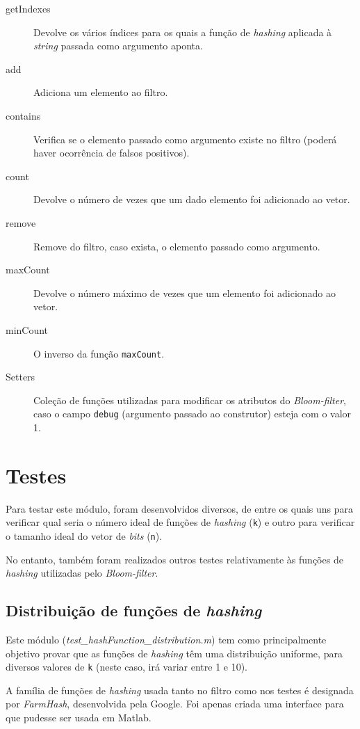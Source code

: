 \documentclass[a4paper,11pt,openright,oneside]{report}
\begin{document}
\begin{description}
\item[getIndexes]
Devolve os vários índices para os quais a função de \textit{hashing} aplicada à \textit{string} passada como argumento aponta.
\item[add]
Adiciona um elemento ao filtro.
\item[contains]
Verifica se o elemento passado como argumento existe no filtro (poderá haver ocorrência de falsos positivos).
\item[count]
Devolve o número de vezes que um dado elemento foi adicionado ao vetor.
\item[remove]
Remove do filtro, caso exista, o elemento passado como argumento.
\item[maxCount]
Devolve o número máximo de vezes que um elemento foi adicionado ao vetor.
\item[minCount]
O inverso da função \texttt{maxCount}.
\item[Setters]
Coleção de funções utilizadas para modificar os atributos do \textit{Bloom-filter}, caso o campo \texttt{debug} (argumento passado ao construtor) esteja com o valor 1.
\end{description}

\section{Testes}
\label{sec.bloomtests}

Para testar este módulo, foram desenvolvidos diversos, de entre os quais uns para verificar qual seria o número ideal de funções de \textit{hashing} (\texttt{k}) e outro para verificar o tamanho ideal do vetor de \textit{bits} (\texttt{n}).

No entanto, também foram realizados outros testes relativamente às funções de \textit{hashing} utilizadas pelo \textit{Bloom-filter}.

\subsection{Distribuição de funções de \textit{hashing}}
\label{subsec.hashdist}

Este módulo (\textit{test\_hashFunction\_distribution.m}) tem como principalmente objetivo provar que as funções de \textit{hashing} têm uma distribuição uniforme, para diversos valores de \texttt{k} (neste caso, irá variar entre 1 e 10).

A família de funções de \textit{hashing} usada tanto no filtro como nos testes é designada por \textit{FarmHash}, desenvolvida pela Google. Foi apenas criada uma interface para que pudesse ser usada em Matlab.
\end{document}
